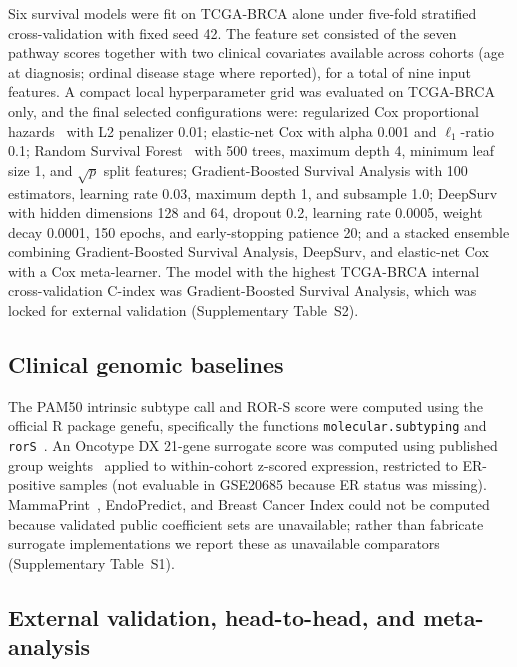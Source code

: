 \documentclass[11pt,letterpaper]{article}
\begin{document}
Six survival models were fit on TCGA-BRCA alone under five-fold stratified cross-validation with fixed seed 42. The feature set consisted of the seven pathway scores together with two clinical covariates available across cohorts (age at diagnosis; ordinal disease stage where reported), for a total of nine input features. A compact local hyperparameter grid was evaluated on TCGA-BRCA only, and the final selected configurations were: regularized Cox proportional hazards~\cite{cox1972regression} with L2 penalizer 0.01; elastic-net Cox with alpha 0.001 and $\ell_1$-ratio 0.1; Random Survival Forest~\cite{ishwaran2008random} with 500 trees, maximum depth 4, minimum leaf size 1, and $\sqrt{p}$ split features; Gradient-Boosted Survival Analysis with 100 estimators, learning rate 0.03, maximum depth 1, and subsample 1.0; DeepSurv~\cite{katzman2018deepsurv} with hidden dimensions 128 and 64, dropout 0.2, learning rate 0.0005, weight decay 0.0001, 150 epochs, and early-stopping patience 20; and a stacked ensemble combining Gradient-Boosted Survival Analysis, DeepSurv, and elastic-net Cox with a Cox meta-learner. The model with the highest TCGA-BRCA internal cross-validation C-index was Gradient-Boosted Survival Analysis, which was locked for external validation (Supplementary Table~S2).

\subsection*{Clinical genomic baselines}

The PAM50 intrinsic subtype call and ROR-S score were computed using the official R package genefu, specifically the functions \texttt{molecular.subtyping} and \texttt{rorS}~\cite{gendoo2016genefu}. An Oncotype DX 21-gene surrogate score was computed using published group weights~\cite{paik2004multigene} applied to within-cohort z-scored expression, restricted to ER-positive samples (not evaluable in GSE20685 because ER status was missing). MammaPrint~\cite{vantveer2002gene}, EndoPredict, and Breast Cancer Index could not be computed because validated public coefficient sets are unavailable; rather than fabricate surrogate implementations we report these as unavailable comparators (Supplementary Table~S1).

\subsection*{External validation, head-to-head, and meta-analysis}
\end{document}
